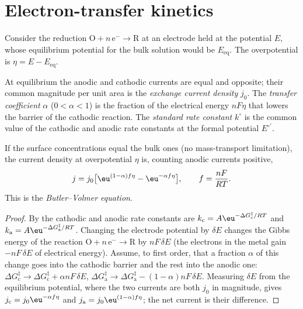 \section{Electron-transfer kinetics}

Consider the reduction $\mathrm{O} + n\,\mathrm{e}^- \to \mathrm{R}$ at an electrode held at the potential $E$,
whose equilibrium potential for the bulk solution would be $E_{\mathrm{eq}}$. The
overpotential is $\eta = E - E_{\mathrm{eq}}$.

\begin{definition}\label{def:b3:electrode-kinetics:exchange}
At equilibrium the anodic and cathodic currents are equal and opposite; their
common magnitude per unit area is the \emph{exchange current
density} $j_0$. The \emph{transfer
coefficient} $\alpha$ ($0 < \alpha < 1$) is the fraction of the
electrical energy $nF\eta$ that lowers the barrier of the cathodic reaction. The
\emph{standard rate constant} $k^\circ$ is the common
value of the cathodic and anodic rate constants at the formal potential $E^{\circ\prime}$.
\end{definition}

\begin{theorem}\label{thm:b3:electrode-kinetics:butler-volmer}
If the surface concentrations equal the bulk ones (no mass-transport
limitation), the current density at overpotential $\eta$ is, counting anodic
currents positive,
\[
  j = j_0\bigl[\eu^{(1 - \alpha)f\eta} - \eu^{-\alpha f\eta}\bigr], \qquad f = \frac{nF}{RT}.
\]
This is the \emph{Butler--Volmer equation}.
\end{theorem}

\begin{proof}
By  the cathodic and anodic rate constants are
$k_{\mathrm c} = A\eu^{-\Delta G_{\mathrm c}^{\ddagger}/RT}$ and $k_{\mathrm a} = A\eu^{-\Delta G_{\mathrm a}^{\ddagger}/RT}$. Changing the electrode potential by $\delta E$
changes the Gibbs energy of the reaction $\mathrm{O} + n\,\mathrm{e}^- \to \mathrm{R}$ by $nF\,\delta E$ (the electrons
in the metal gain $-nF\,\delta E$ of electrical energy). Assume, to first order, that a
fraction $\alpha$ of this change goes into the cathodic barrier and the rest into the
anodic one: $\Delta G_{\mathrm c}^{\ddagger} \to \Delta G_{\mathrm c}^{\ddagger} + \alpha nF\,\delta E$, $\Delta G_{\mathrm a}^{\ddagger} \to \Delta G_{\mathrm a}^{\ddagger} - (1 - \alpha)nF\,\delta E$. Measuring $\delta E$
from the equilibrium potential, where the two currents are both $j_0$ in
magnitude, gives $j_{\mathrm c} = j_0\eu^{-\alpha f\eta}$ and $j_{\mathrm a} = j_0\eu^{(1 - \alpha)f\eta}$; the net current is their
difference.
\end{proof}

